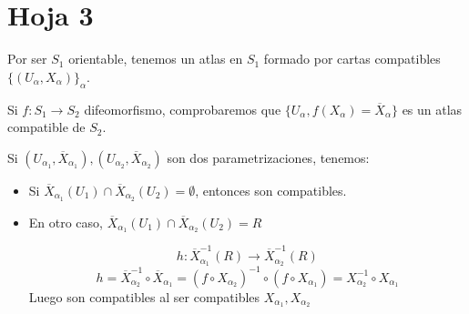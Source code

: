 \documentclass[openany]{book}
\begin{document}
\chapter{Hoja 3}

\begin{exercise}
    Por ser $ S_1 $ orientable, tenemos un atlas en $ S_1 $ formado por cartas compatibles $ \{(U_{\alpha},X_{\alpha})\}_{\alpha} $.
    
    Si $ f:S_1 \to S_2 $ difeomorfismo, comprobaremos que $ \{U_{\alpha},f(X_{\alpha})=\overline{X}_{\alpha}\} $ es un atlas compatible de $ S_2 $.

    Si $ (U_{\alpha_1},\overline{X}_{\alpha_1}), (U_{\alpha_2},\overline{X}_{\alpha_2}) $ son dos parametrizaciones, tenemos:
    \begin{itemize}
        \item Si $ \overline{X}_{\alpha_1}(U_{1}) \cap \overline{X}_{\alpha_2}(U_2) = \emptyset $, entonces son compatibles.
        \item En otro caso, $ \overline{X}_{\alpha_1}(U_1) \cap \overline{X}_{\alpha_2}(U_2)= R$
        
        $$ h: \overline{X}_{\alpha_1}^{-1}(R) \to \overline{X}_{\alpha_2} ^{-1}(R)$$
        $$ h = \overline{X}_{\alpha_2}^{-1} \circ \overline{X}_{\alpha_1} = (f \circ X_{\alpha_2}) ^{-1} \circ (f\circ X_{\alpha_1}) = X_{\alpha_2} ^{-1} \circ X_{\alpha_1}$$
        Luego son compatibles al ser compatibles $ X_{\alpha_1},X_{\alpha_2} $
    \end{itemize}
\end{exercise}






\setcounter{ex}{11}
\end{document}
